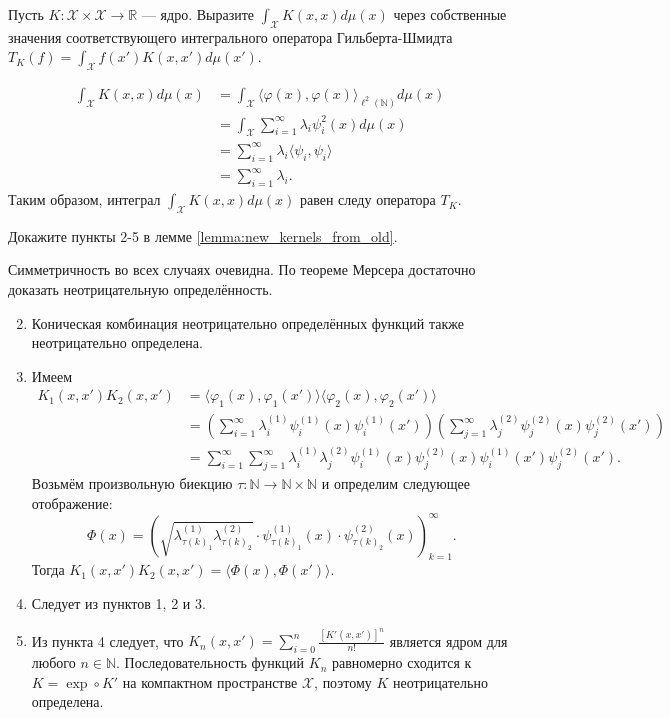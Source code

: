\begin{problem}
Пусть $K \colon \mathcal{X} \times \mathcal{X} \to \mathbb{R}$ --- ядро. Выразите $\int_\mathcal{X} K(x, x) d\mu(x)$ через собственные значения соответствующего интегрального оператора Гильберта-Шмидта $T_K(f) = \int_\mathcal{X} f(x') K(x, x') d\mu(x')$.
\end{problem}
\begin{solution}
\begin{align*}
    \int_\mathcal{X} K(x, x) d\mu(x) &= \int_\mathcal{X} \langle \varphi(x), \varphi(x) \rangle_{\ell^2(\mathbb{N})} d\mu(x) \\
    &= \int_\mathcal{X} \sum_{i=1}^\infty \lambda_i \psi_i^2(x) d\mu(x) \\
    &= \sum_{i=1}^\infty \lambda_i \langle \psi_i, \psi_i \rangle \\
    &= \sum_{i=1}^\infty \lambda_i.
\end{align*}
Таким образом, интеграл $\int_\mathcal{X} K(x, x) d\mu(x)$ равен следу оператора $T_K$.
\end{solution}

\begin{problem}
Докажите пункты 2-5 в лемме \ref{lemma:new_kernels_from_old}.
\end{problem}
\begin{solution}
Симметричность во всех случаях очевидна. По теореме Мерсера достаточно доказать неотрицательную определённость.
\begin{enumerate}
    \setcounter{enumi}{1}
    \item Коническая комбинация неотрицательно определённых функций также неотрицательно определена.
    \item Имеем
    \begin{align*}
        K_1(x, x') K_2(x, x') &= \langle \varphi_1(x), \varphi_1(x') \rangle \langle \varphi_2(x), \varphi_2(x') \rangle \\
        &= \left( \sum_{i=1}^\infty \lambda_i^{(1)} \psi_i^{(1)}(x)\psi_i^{(1)}(x') \right) \left( \sum_{j=1}^\infty \lambda_j^{(2)} \psi_j^{(2)}(x)\psi_j^{(2)}(x') \right) \\
        &= \sum_{i=1}^\infty \sum_{j=1}^\infty \lambda_i^{(1)} \lambda_j^{(2)} \psi_i^{(1)}(x) \psi_j^{(2)}(x) \psi_i^{(1)}(x') \psi_j^{(2)}(x').
    \end{align*}
    Возьмём произвольную биекцию $\tau \colon \mathbb{N} \to \mathbb{N} \times \mathbb{N}$ и определим следующее отображение:
    \[ \varPhi(x) = \left(\sqrt{\lambda^{(1)}_{\tau(k)_1} \lambda^{(2)}_{\tau(k)_2}} \cdot \psi_{\tau(k)_1}^{(1)}(x) \cdot \psi_{\tau(k)_2}^{(2)}(x)\right)_{k=1}^\infty. \]
    Тогда $K_1(x, x') K_2(x, x') = \langle \varPhi(x), \varPhi(x') \rangle$.
    \item Следует из пунктов 1, 2 и 3.
    \item Из пункта 4 следует, что $K_n(x, x') = \sum_{i=0}^n \frac{[K'(x, x')]^n}{n!}$ является ядром для любого $n \in \mathbb{N}$. Последовательность функций $K_n$ равномерно сходится к $K = \exp \circ K'$ на компактном пространстве $\mathcal{X}$, поэтому $K$ неотрицательно определена.
\end{enumerate}
\end{solution}


